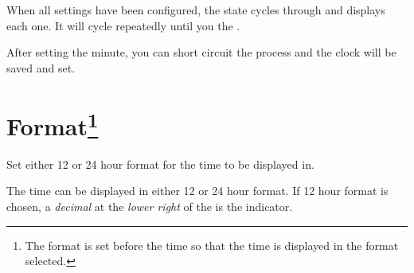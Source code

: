 \tabcolsep=8pt
\tabcolsep=12pt

When all settings have been configured, the  state cycles through and
displays each one.  It will cycle repeatedly until you  the .

\par\medskip

After setting the minute, you can short circuit the process and the clock
will be saved and set.

\tabcolsep=7pt
\tabcolsep=12pt

\section[Format]{Format\footnote{ The format is set before
  the time so that the time is displayed in the format selected.}} 

Set either \num{12} or \num{24} hour format for the time to be displayed in.


The time can be displayed in either \num{12} or \num{24} hour format. If
\num{12} hour format is chosen, a \textit{decimal} at the \textit{lower right}
of the  is the  indicator.


